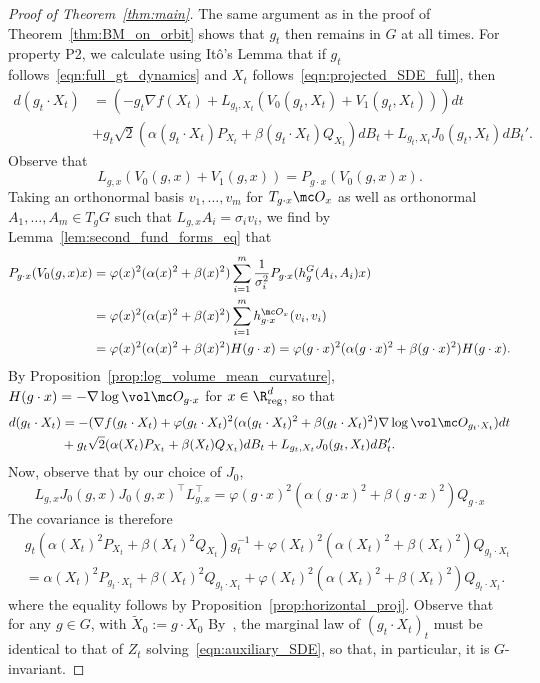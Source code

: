 \documentclass[twoside,a4paper,11pt]{article}
\renewcommand{\phi}{\varphi}
\newcommand{\reg}{\mathrm{reg}}
\theoremstyle{plain}
\begin{document}
\begin{proof}[Proof of Theorem~\ref{thm:main}]
The same argument as in the proof of Theorem~\ref{thm:BM_on_orbit}
shows that $g_t$ then remains in $G$ at all times.
For property P2, we calculate using Itô's Lemma that if $g_t$ follows~\eqref{eqn:full_gt_dynamics}
and $X_t$ follows~\eqref{eqn:projected_SDE_full},
then
\begin{align*}
d(g_t \cdot X_t) &= 
(-g_t\nabla f(X_t) + L_{g_t, X_t}(V_0(g_t, X_t)
+ V_1(g_t, X_t)))dt \\
&+ g_t\sqrt{2}(\alpha(g_t \cdot X_t)
P_{X_t} + \beta(g_t \cdot X_t)Q_{X_t})dB_t
+ L_{g_t, X_t}J_0(g_t, X_t)dB_t'.
\end{align*}
Observe that
$$
L_{g, x}(V_0(g, x)
 + V_1(g, x)) = P_{g\cdot x}(V_0(g, x)x).
$$ Taking an orthonormal basis $v_1,\ldots, v_m$
for $T_{g\cdot x}\mc O_x$ as well as
orthonormal $A_1, \ldots, A_m \in T_gG$ such that $L_{g, x}A_i=\sigma_i v_i$, we find
by Lemma~\ref{lem:second_fund_forms_eq} that
\begin{align*}
P_{g\cdot x}(V_0(g, x)x) &=
\phi(x)^2(\alpha(x)^2 + \beta(x)^2)
\sum_{i = 1}^m \frac{1}{\sigma_i^2}P_{g\cdot x}(h_g^G(A_i, A_i)x)\\
&=\phi(x)^2(\alpha(x)^2 + \beta(x)^2)
\sum_{i = 1}^m h_{g\cdot x}^{\mc O_x}(v_i, v_i) \\
&= \phi(x)^2(\alpha(x)^2 + \beta(x)^2)H(g\cdot x)
= \phi(g\cdot x)^2(\alpha(g\cdot x)^2 + \beta(g \cdot x)^2)
H(g\cdot x).
\end{align*}
By Proposition~\ref{prop:log_volume_mean_curvature}, $H(g \cdot x)
= -\nabla \log \vol \mc O_{g \cdot x}$ for $x \in \R^d_{\reg}$, so that
\begin{align*}
d(g_t \cdot X_t)
&= - (\nabla f(g_t\cdot X_t)
+ \phi(g_t \cdot X_t)^2 (\alpha(g_t \cdot X_t)^2 + \beta(g_t \cdot X_t)^2)\nabla \log \vol \mc O_{g_t \cdot X_t})dt \\
&+g_t\sqrt{2}(\alpha(X_t)
P_{X_t}
+ \beta(X_t)Q_{X_t})dB_t + L_{g_t, X_t}J_0(g_t, X_t)dB_t'.
\end{align*}
Now, observe that by our choice of $J_0$,
$$
L_{g, x}J_0(g, x) J_0(g, x)^\top L_{g, x}^\top
= \phi(g\cdot x)^2(\alpha(g\cdot x)^2 + \beta(g\cdot x)^2)
Q_{g \cdot x}
$$
The covariance is therefore
\begin{align*}
&g_t(\alpha(X_t)^2P_{X_t} + \beta(X_t)^2Q_{X_t})g_t^{-1}
+
\phi(X_t)^2(\alpha(X_t)^2 + \beta(X_t)^2)
Q_{g_t \cdot X_t}\\
&= \alpha(X_t)^2P_{g_t\cdot X_t}
+ \beta(X_t)^2 Q_{g_t\cdot X_t} + \phi(X_t)^2(\alpha(X_t)^2 + \beta(X_t)^2)
Q_{g_t \cdot X_t}.
\end{align*}
where the equality follows by Proposition~\ref{prop:horizontal_proj}.
Observe that for any $g \in G$,
with $\tilde X_0 := g \cdot X_0$
By~\cite[Theorem 9.4.3]{bogachev2022fokker},
the marginal law of $(g_t \cdot X_t)_t$ must be 
identical to that of $Z_t$ solving~\eqref{eqn:auxiliary_SDE},
so that, in particular, it is $G$-invariant.


\end{proof}
\end{document}
